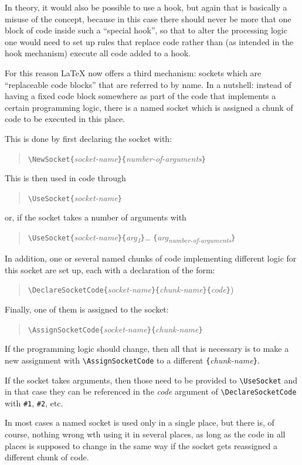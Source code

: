 \documentclass{article}
\newcommand\cs[1]{\texttt{\textbackslash #1}}
\newcommand\meta[1]{\textlangle\textit{#1}\textrangle}
\newcommand\marg[1]{\texttt\{\meta{#1}\texttt\}}
\begin{document}
In theory, it would also be possible to use a hook, but again that is
basically a misuse of the concept, because in this case there should
never be more that one block of code inside such a  \enquote{special hook}, so that to alter
the processing logic one would need to set up rules that replace code
rather than (as intended in the hook mechanism) execute all code added to a hook.



For this reason \LaTeX{} now offers a third mechanism: sockets
which are \enquote{replaceable code blocks} that are referred to by name.
%
In a nutshell: instead of having a fixed code block somewhere as part
of the code that implements a certain programming logic, there is a named socket
which is assigned a chunk of code to be executed in this place.

This is done by first declaring the socket with:
\begin{quote}
\cs{NewSocket}\marg{socket-name}\marg{number-of-arguments}
\end{quote}
This is then used in code through
\begin{quote}
 \cs{UseSocket}\marg{socket-name}
\end{quote}
or, if the socket takes a number of arguments with
\begin{quote}
  \cs{UseSocket}\marg{socket-name}\marg{arg\textsubscript{1}}\ldots
  \marg{arg\textsubscript{number-of-arguments}}
\end{quote}

In addition, one or several named chunks of code implementing different logic for this
socket are set up, each with a declaration of the form:
\begin{quote}
  \cs{DeclareSocketCode}\marg{socket-name}\marg{chunk-name}\marg{code})
\end{quote}
Finally,
one of them is assigned to the socket:
\begin{quote}
\cs{AssignSocketCode}\marg{socket-name}\marg{chunk-name}
\end{quote}
If the programming logic should change, then all that is necessary is
to make a new assignment with \cs{AssignSocketCode} to a different
\marg{chunk-name}.

If the socket takes arguments, then those need to be provided to
\cs{UseSocket} and in that case they can be referenced in the \meta{code}
argument of \cs{DeclareSocketCode} with \verb=#1=, \verb=#2=, etc.

In most cases a named socket is used only in a single place, but there
is, of course, nothing wrong wth using it in several places, as long
as the code in all places is supposed to change in the same way if the socket gets reassigned a different chunk of code.
\end{document}
